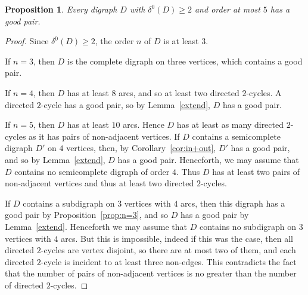 \documentclass{article}
\newtheorem{proposition}[theorem]{Proposition}
\theoremstyle{definition}
\newcommand{\2}{\vspace{0.2cm}}
\begin{document}
\begin{proposition}\label{prop:small}
Every digraph $D$ with $\delta^0(D)\geq 2$ and order at most $5$ has a good pair.
\end{proposition}
\begin{proof}
Since $\delta^0(D)\geq 2$, the order $n$ of $D$ is at least $3$.

If $n=3$, then $D$ is the complete digraph on three vertices, which
contains a good pair.

If $n = 4$, then $D$ has at least $8$ arcs, and so at least two
directed $2$-cycles.  A directed $2$-cycle has a good pair, so by
Lemma~\ref{extend}, $D$ has a good pair.

If $n=5$, then $D$ has at least $10$ arcs.  Hence $D$ has at least as
many directed $2$-cycles as it has pairs of non-adjacent vertices.  If
$D$ contains a semicomplete digraph $D'$ on $4$ vertices, then, by
Corollary~\ref{cor:in+out}, $D'$ has a good pair, and so by
Lemma~\ref{extend}, $D$ has a good pair.  Henceforth, we may assume
that $D$ contains no semicomplete digraph of order $4$. Thus $D$ has
at least two pairs of non-adjacent vertices and thus at least two
directed $2$-cycles.

If $D$ contains a subdigraph on $3$ vertices with $4$ arcs, then this
digraph has a good pair by Proposition~\ref{prop:n=3}, and so $D$ has
a good pair by Lemma~\ref{extend}.  Henceforth we may assume that $D$
contains no subdigraph on $3$ vertices with $4$ arcs.  But this is
impossible, indeed if this was the case, then all directed $2$-cycles are
vertex disjoint, so there are at most two of them, and each directed $2$-cycle
is incident to at least three non-edges. This contradicts the fact
that the number of pairs of non-adjacent vertices is no greater than
the number of directed $2$-cycles.
\end{proof}
\end{document}
